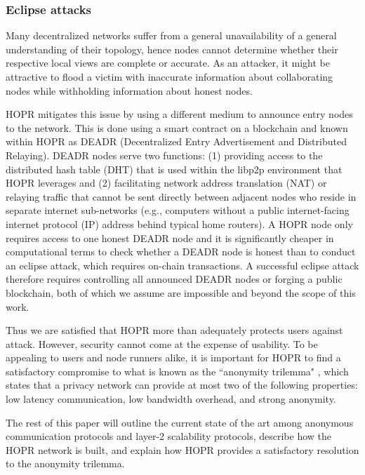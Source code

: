\subsubsection{Eclipse attacks}
Many decentralized networks suffer from a general unavailability of a general understanding of their topology, hence nodes cannot determine whether their respective local views are complete or accurate. As an attacker, it might be attractive to flood a victim with inaccurate information about collaborating nodes while withholding information about honest nodes.

HOPR mitigates this issue by using a different medium to announce entry nodes to the network. This is done using a smart contract on a blockchain and known within HOPR as DEADR (Decentralized Entry Advertisement and Distributed Relaying). DEADR nodes serve two functions: (1) providing access to the distributed hash table (DHT) that is used within the libp2p environment that HOPR leverages and (2) facilitating network address translation (NAT) or relaying traffic that cannot be sent directly between adjacent nodes who reside in separate internet sub-networks (e.g., computers without a public internet-facing internet protocol (IP) address behind typical home routers). A HOPR node only requires access to one honest DEADR node and it is significantly cheaper in computational terms to check whether a DEADR node is honest than to conduct an eclipse attack, which requires on-chain transactions. A successful eclipse attack therefore requires controlling all announced DEADR nodes or forging a public blockchain, both of which we assume are impossible and beyond the scope of this work.

Thus we are satisfied that HOPR more than adequately protects users against attack. However, security cannot come at the expense of usability. To be appealing to users and node runners alike, it is important for HOPR to find a satisfactory compromise to what is known as the ``anonymity trilemma" \cite{AnonymityTrilemma}, which states that a privacy network can provide at most two of the following properties: low latency communication, low bandwidth overhead, and strong anonymity.

The rest of this paper will outline the current state of the art among anonymous communication protocols and layer-2 scalability protocols, describe how the HOPR network is built, and explain how HOPR provides a satisfactory resolution to the anonymity trilemma.
